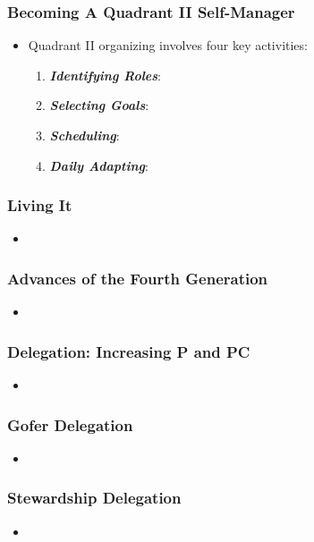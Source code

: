 \documentclass[11pt]{article}
\begin{document}
\subsubsection{Becoming A Quadrant II Self-Manager}
\begin{itemize}
\item Quadrant II organizing involves four key activities:
\begin{enumerate}
\item \textbf{\emph{Identifying Roles}}: 
\item \textbf{\emph{Selecting Goals}}: 
\item \textbf{\emph{Scheduling}}:
\item \textbf{\emph{Daily Adapting}}:
\end{enumerate}
\end{itemize}
\subsubsection{Living It}
\begin{itemize}
\item 
\end{itemize}
\subsubsection{Advances of the Fourth Generation}
\begin{itemize}
\item 
\end{itemize}
\subsubsection{Delegation: Increasing P and PC}
\begin{itemize}
\item 
\end{itemize}
\subsubsection{Gofer Delegation}
\begin{itemize}
\item 
\end{itemize}
\subsubsection{Stewardship Delegation}
\begin{itemize}
\item 
\end{itemize}
\end{document}
